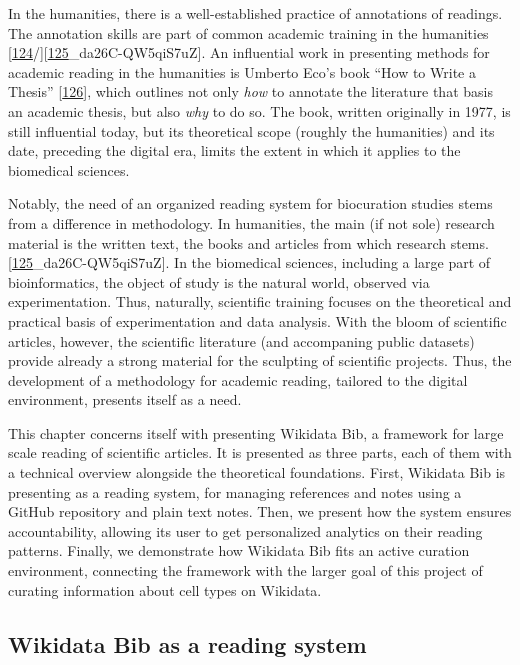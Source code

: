 In the humanities, there is a well-established practice of annotations of readings.
The annotation skills are part of common academic training in the humanities {[}\protect\hyperlink{ref-rPKBwmYh}{124}/{]}{[}\protect\hyperlink{ref-PKhuVRW8}{125}\_da26C-QW5qiS7uZ{]}.
An influential work in presenting methods for academic reading in the humanities is Umberto Eco's book ``How to Write a Thesis'' {[}\protect\hyperlink{ref-1HBVPtZGp}{126}{]}, which outlines not only \emph{how} to annotate the literature that basis an academic thesis, but also \emph{why} to do so.
The book, written originally in 1977, is still influential today, but its theoretical scope (roughly the humanities) and its date, preceding the digital era, limits the extent in which it applies to the biomedical sciences.

Notably, the need of an organized reading system for biocuration studies stems from a difference in methodology.
In humanities, the main (if not sole) research material is the written text, the books and articles from which research stems. {[}\protect\hyperlink{ref-PKhuVRW8}{125}\_da26C-QW5qiS7uZ{]}.
In the biomedical sciences, including a large part of bioinformatics, the object of study is the natural world, observed via experimentation.
Thus, naturally, scientific training focuses on the theoretical and practical basis of experimentation and data analysis.
With the bloom of scientific articles, however, the scientific literature (and accompaning public datasets) provide already a strong material for the sculpting of scientific projects.
Thus, the development of a methodology for academic reading, tailored to the digital environment, presents itself as a need.

This chapter concerns itself with presenting Wikidata Bib, a framework for large scale reading of scientific articles.
It is presented as three parts, each of them with a technical overview alongside the theoretical foundations.
First, Wikidata Bib is presenting as a reading system, for managing references and notes using a GitHub repository and plain text notes.
Then, we present how the system ensures accountability, allowing its user to get personalized analytics on their reading patterns.
Finally, we demonstrate how Wikidata Bib fits an active curation environment, connecting the framework with the larger goal of this project of curating information about cell types on Wikidata.

\hypertarget{wikidata-bib-as-a-reading-system}{%
\subsection{Wikidata Bib as a reading system}\label{wikidata-bib-as-a-reading-system}}


